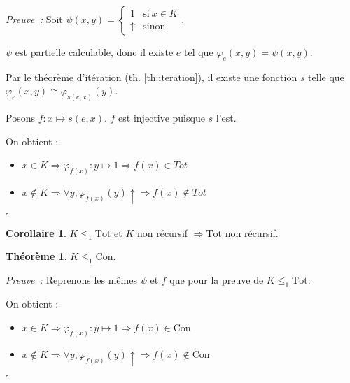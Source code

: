 \documentclass{book}
\theoremstyle{definition}
\newtheorem{theorem}{Théorème}
\newtheorem{corollary}{Corollaire}
\numberwithin{lemma}{subsection}
\numberwithin{theorem}{subsection}
\numberwithin{definition}{subsection}
\numberwithin{proposition}{subsection}
\numberwithin{corollary}{subsection}
\numberwithin{property}{subsection}
\numberwithin{example}{subsection}
\numberwithin{heuristique}{subsection}
\numberwithin{scenario}{subsection}
\newenvironment{proofi} {\noindent\emph{Preuve~:}} {\hfill $\square$\vspace{0.2cm}}
\newcommand{\GodelFunc}[1]{\varphi_{#1}}
\newcommand{\EnsTot}{\mathrm{Tot}}
\newcommand{\EnsCon}{\mathrm{Con}}
\begin{document}
            \begin{proofi}
                Soit $\psi(x,y) = \begin{cases}
                    1 & \mathrm{si~} x \in K \\
                    \uparrow & \mathrm{sinon}
                \end{cases}$.
                \par $\psi$ est partielle calculable, donc il existe $e$ tel que $\GodelFunc{e}(x,y) = \psi(x,y)$.
                \par Par le théorème d'itération (th. \ref{th:iteration}), il existe une fonction $s$ telle que $\GodelFunc{e}(x,y) \cong \GodelFunc{s(e,x)}(y)$. 
                \par Posons $f : x \mapsto s(e,x)$. $f$ est injective puisque $s$ l'est.
                \par On obtient :
                \begin{itemize}
                    \item $x \in K \Rightarrow \GodelFunc{f(x)} : y \mapsto 1 \Rightarrow f(x) \in Tot$
                    \item $x \not\in K \Rightarrow \forall y, \GodelFunc{f(x)}(y)\uparrow \Rightarrow f(x) \not\in Tot$
                \end{itemize}
                \vspace{-\baselineskip}
            \end{proofi}
            
            \begin{corollary}\label{cor:Tot_non_rec}
                $K \leq_1 \EnsTot$ et $K$ non récursif $\Rightarrow \EnsTot$ non récursif.
            \end{corollary}
            
            \begin{theorem}
                $K \leq_1 \EnsCon$.
            \end{theorem}
            
            \begin{proofi}
                Reprenons les mêmes $\psi$ et $f$ que pour la preuve de $K \leq_1 \EnsTot$.
                \par On obtient :
                \begin{itemize}
                    \item $x \in K \Rightarrow \GodelFunc{f(x)} : y \mapsto 1 \Rightarrow f(x) \in \EnsCon$
                    \item $x \not\in K \Rightarrow \forall y, \GodelFunc{f(x)}(y)\uparrow \Rightarrow f(x) \not\in \EnsCon$
                \end{itemize}
                \vspace{-\baselineskip}
            \end{proofi}
            
\end{document}
